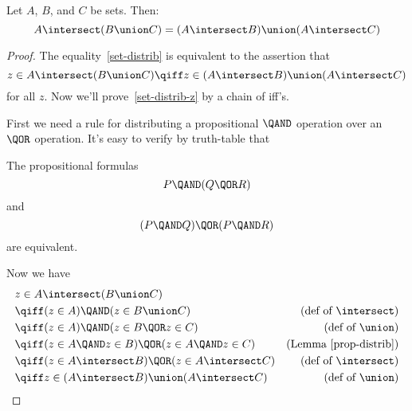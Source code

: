 \begin{theorem}
Let $A$, $B$, and $C$ be sets.  Then:
\begin{equation}\label{set-distrib}
A \intersect (B \union C) = (A \intersect B) \union (A \intersect C)
\end{equation}
\end{theorem}

\begin{proof}
The equality~\eqref{set-distrib} is equivalent to the assertion that
\begin{equation}\label{set-distrib-z}
  z \in A \intersect (B \union C) \qiff z \in (A \intersect B)
  \union (A \intersect C)
\end{equation}
for all $z$.  Now we'll prove~\eqref{set-distrib-z} by a chain of iff's.

First we need a rule for distributing a propositional $\QAND$ operation
over an $\QOR$ operation.  It's easy to verify by truth-table that
\begin{lemma}\label{prop-distrib}
The propositional formulas
\[
P \QAND (Q \QOR R)
\]
and
\[
(P \QAND Q) \QOR (P \QAND R)
\]
are equivalent.
\end{lemma}

Now we have
\begin{align*}
\lefteqn{z \in A \intersect (B \union C)}\\
& \qiff (z \in A) \QAND (z \in B \union C) & \text{(def of $\intersect$)}\\
& \qiff (z \in A) \QAND (z \in B \QOR z \in C)
                & \text{(def of $\union$)}\\
& \qiff (z \in A \QAND z \in B) \QOR (z \in A \QAND z \in C)
                & \text{(Lemma~\ref{prop-distrib})}\\
& \qiff (z \in A \intersect B) \QOR (z \in A \intersect C)
                & \text{(def of $\intersect$)}\\
& \qiff z \in (A \intersect B) \union (A \intersect C)
                & \text{(def of $\union$)}
\end{align*}

\end{proof}
  

